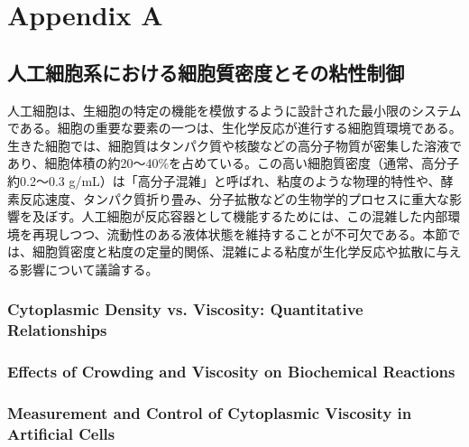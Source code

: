 \chapter*{Appendix A}
\section{人工細胞系における細胞質密度とその粘性制御}
人工細胞は、生細胞の特定の機能を模倣するように設計された最小限のシステムである。細胞の重要な要素の一つは、生化学反応が進行する細胞質環境である。生きた細胞では、細胞質はタンパク質や核酸などの高分子物質が密集した溶液であり、細胞体積の約20～40\%を占めている。この高い細胞質密度（通常、高分子約0.2～0.3 g/mL）は「高分子混雑」と呼ばれ、粘度のような物理的特性や、酵素反応速度、タンパク質折り畳み、分子拡散などの生物学的プロセスに重大な影響を及ぼす。人工細胞が反応容器として機能するためには、この混雑した内部環境を再現しつつ、流動性のある液体状態を維持することが不可欠である。本節では、細胞質密度と粘度の定量的関係、混雑による粘度が生化学反応や拡散に与える影響について議論する。
\subsection{Cytoplasmic Density vs. Viscosity: Quantitative Relationships}
\subsection{Effects of Crowding and Viscosity on Biochemical Reactions}
\subsection{Measurement and Control of Cytoplasmic Viscosity in Artificial Cells}
